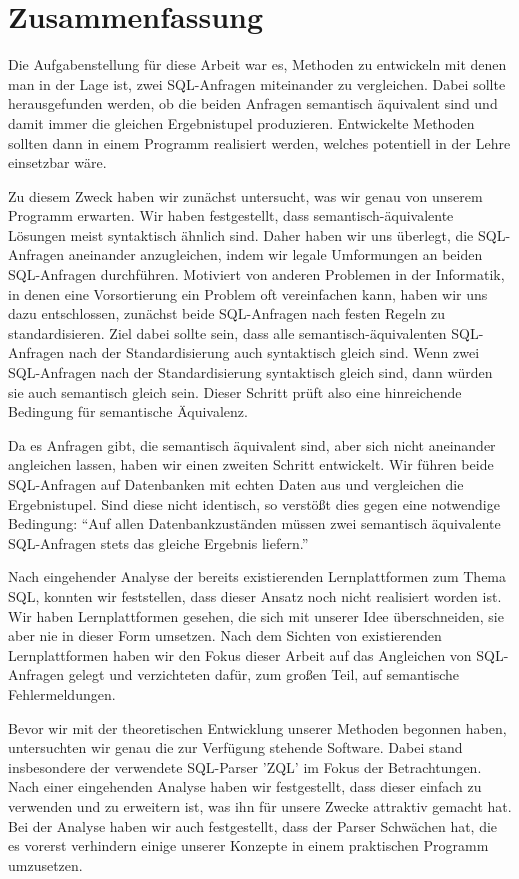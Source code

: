 
\section{Zusammenfassung}

Die Aufgabenstellung für diese Arbeit war es, Methoden zu entwickeln mit denen man in der Lage ist, zwei SQL-Anfragen miteinander zu vergleichen. Dabei sollte herausgefunden werden, ob die beiden Anfragen semantisch äquivalent sind und damit immer die gleichen Ergebnistupel produzieren. Entwickelte Methoden sollten dann in einem Programm realisiert werden, welches potentiell in der Lehre einsetzbar wäre. 

Zu diesem Zweck haben wir zunächst untersucht, was wir genau von unserem Programm erwarten. Wir haben festgestellt, dass semantisch-äquivalente Lösungen meist syntaktisch ähnlich sind. Daher haben wir uns überlegt, die SQL-Anfragen aneinander anzugleichen, indem wir legale Umformungen an beiden SQL-Anfragen durchführen. Motiviert von anderen Problemen in der Informatik, in denen eine Vorsortierung ein Problem oft vereinfachen kann, haben wir uns dazu entschlossen, zunächst beide SQL-Anfragen nach festen Regeln zu standardisieren. Ziel dabei sollte sein, dass alle semantisch-äquivalenten SQL-Anfragen nach der Standardisierung auch syntaktisch gleich sind. Wenn zwei SQL-Anfragen nach der Standardisierung syntaktisch gleich sind, dann würden sie auch semantisch gleich sein. Dieser Schritt prüft also eine hinreichende Bedingung für semantische Äquivalenz.

Da es Anfragen gibt, die semantisch äquivalent sind, aber sich nicht aneinander angleichen lassen, haben wir einen zweiten Schritt entwickelt. Wir führen beide SQL-Anfragen auf Datenbanken mit echten Daten aus und vergleichen die Ergebnistupel. Sind diese nicht identisch, so verstößt dies gegen eine notwendige Bedingung: ``Auf allen Datenbankzuständen müssen zwei semantisch äquivalente SQL-Anfragen stets das gleiche Ergebnis liefern.'' 

Nach eingehender Analyse der bereits existierenden Lernplattformen zum Thema SQL, konnten wir feststellen, dass dieser Ansatz noch nicht realisiert worden ist. Wir haben Lernplattformen gesehen, die sich mit unserer Idee überschneiden, sie aber nie in dieser Form umsetzen. Nach dem Sichten von existierenden Lernplattformen haben wir den Fokus dieser Arbeit auf das Angleichen von SQL-Anfragen gelegt und verzichteten dafür, zum großen Teil, auf semantische Fehlermeldungen. 

Bevor wir mit der theoretischen Entwicklung unserer Methoden begonnen haben, untersuchten wir genau die zur Verfügung stehende Software. Dabei stand insbesondere der verwendete SQL-Parser 'ZQL' im Fokus der Betrachtungen. Nach einer eingehenden Analyse haben wir festgestellt, dass dieser einfach zu verwenden und zu erweitern ist, was ihn für unsere Zwecke attraktiv gemacht hat. Bei der Analyse haben wir auch festgestellt, dass der Parser Schwächen hat, die es vorerst verhindern einige unserer Konzepte in einem praktischen Programm umzusetzen.

